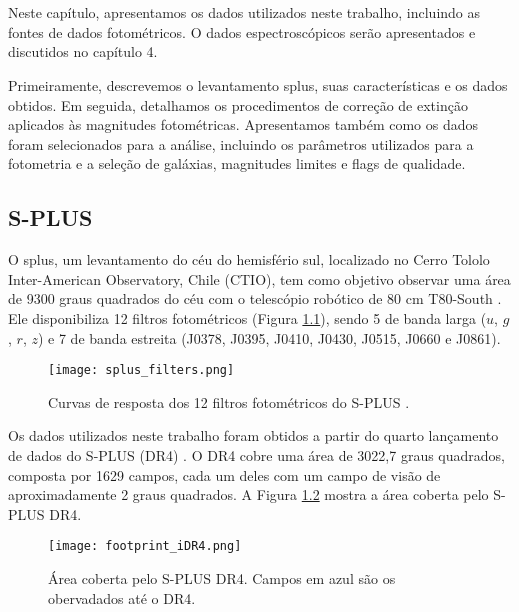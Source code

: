 \chapter{\chapternamedatabase}\label{database}

Neste capítulo, apresentamos os dados utilizados neste trabalho, incluindo as fontes de dados fotométricos. O dados espectroscópicos serão apresentados e discutidos no capítulo 4. 

Primeiramente, descrevemos o levantamento \ac{splus}, suas características e os dados obtidos. Em seguida, detalhamos os procedimentos de correção de extinção aplicados às magnitudes fotométricas. Apresentamos também como os dados foram selecionados para a análise, incluindo os parâmetros utilizados para a fotometria e a seleção de galáxias, magnitudes limites e flags de qualidade.

\section{S-PLUS}
O \ac{splus}, um levantamento do céu do hemisfério sul, localizado no Cerro Tololo Inter-American Observatory, Chile (CTIO), tem como objetivo observar uma área de 9300 graus quadrados do céu com o telescópio robótico de 80 cm T80-South \citep{oliveira2019splus}. Ele disponibiliza 12 filtros fotométricos (Figura \ref{splus_filters}), sendo 5 de banda larga ($u$, $g$, $r$, $z$) e 7 de banda estreita (J0378, J0395, J0410, J0430, J0515, J0660 e J0861).

\begin{figure}[!ht]
    \begin{center}
    \texttt{[image: splus\_filters.png]}
    \caption[]{Curvas de resposta dos 12 filtros fotométricos do S-PLUS \citep{splus_DR4_footprint}.}
    \label{splus_filters}
    \end{center}
\end{figure}

Os dados utilizados neste trabalho foram obtidos a partir do quarto lançamento de dados do S-PLUS (\ac{DR4}) \citep{herpich2024fourthsplusdatarelease}. O DR4 cobre uma área de 3022,7 graus quadrados, composta por 1629 campos, cada um deles com um campo de visão de aproximadamente 2 graus quadrados. A Figura \ref{footprint_iDR4} mostra a área coberta pelo S-PLUS \ac{DR4}.

\begin{figure}[!ht]
    \begin{center}
    \texttt{[image: footprint\_iDR4.png]}
    \caption[]{Área coberta pelo S-PLUS DR4. Campos em azul são os obervadados até o DR4.}
    \label{footprint_iDR4}
    \end{center}
\end{figure}

